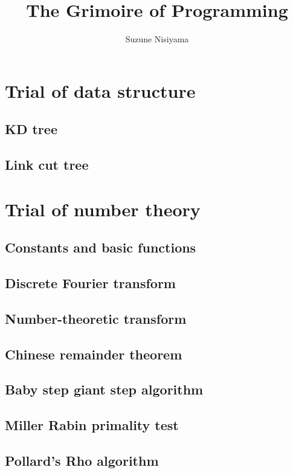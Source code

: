 \documentclass[UTF8,a4paper]{report}
\title{The Grimoire of Programming}
\date{}
\author{Suzune Nisiyama}
\begin{document}
	\tableofcontents
	\chapter{Trial of data structure}
		\section{KD tree}
			
		\section{Link cut tree}
			
	\chapter{Trial of number theory}
		\section{Constants and basic functions}
			
		\section{Discrete Fourier transform}
			
		\section{Number-theoretic transform}
			
		\section{Chinese remainder theorem}
			
		\section{Baby step giant step algorithm}
			
		\section{Miller Rabin primality test}
			
		\section{Pollard's Rho algorithm}
			
\end{document}
